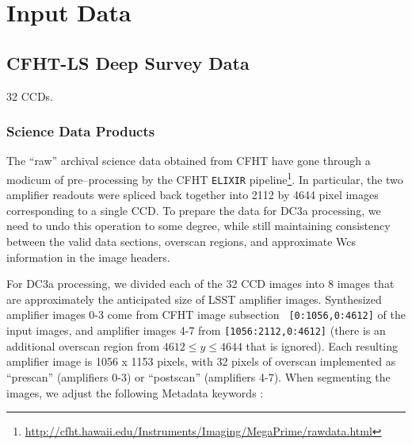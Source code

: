 
\section{Input Data}


\subsection{CFHT-LS Deep Survey Data}

32 CCDs.

\subsubsection{Science Data Products}

The ``raw'' archival science data obtained from CFHT have  gone through
a modicum of pre--processing by the CFHT {\tt ELIXIR}
pipeline\footnote{\url{http://cfht.hawaii.edu/Instruments/Imaging/MegaPrime/rawdata.html}}.
In particular, the two amplifier readouts were spliced back together
into 2112 by 4644 pixel images corresponding to a single CCD.  To prepare the data for DC3a processing, we need
to undo this operation to some degree, while still maintaining
consistency between the valid data sections, overscan regions, and
approximate Wcs information in the image headers.

For DC3a processing, we divided each of the 32 CCD images into 8 images
that are approximately the anticipated size of LSST amplifier images.
Synthesized amplifier images 0-3 come from CFHT image subsection {\tt
[0:1056,0:4612]} of the input images, and amplifier images 4-7 from
{\tt [1056:2112,0:4612]} (there is an additional overscan region from
$4612 \leq y \leq 4644$ that is ignored).  Each resulting amplifier
image is 1056 x 1153 pixels, with 32 pixels of overscan implemented as
``prescan'' (amplifiers 0-3) or ``postscan'' (amplifiers 4-7).  When segmenting the images, we adjust the following Metadata keywords :



